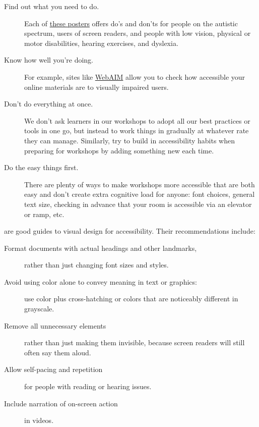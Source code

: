 \begin{description}

\item[Find out what you need to do.] Each of
  \href{https://accessibility.blog.gov.uk/2016/09/02/dos-and-donts-on-designing-for-accessibility/}{these
    posters} offers do's and don'ts for people on the autistic
  spectrum, users of screen readers, and people with low vision,
  physical or motor disabilities, hearing exercises, and dyslexia.

\item[Know how well you're doing.] For example, sites like
  \href{http://webaim.org/}{WebAIM} allow you to check how accessible
  your online materials are to visually impaired users.

\item[Don't do everything at once.]  We don't ask learners in our
  workshops to adopt all our best practices or tools in one go, but
  instead to work things in gradually at whatever rate they can
  manage.  Similarly, try to build in accessibility habits when
  preparing for workshops by adding something new each time.

\item[Do the easy things first.] There are plenty of ways to make
  workshops more accessible that are both easy and don't create extra
  cognitive load for anyone: font choices, general text size, checking
  in advance that your room is accessible via an elevator or ramp,
  etc.

\end{description}

\noindent
\cite{Coom2012,Burg2015} are good guides to visual design for
accessibility. Their recommendations include:

\begin{description}

\item[Format documents with actual headings and other landmarks,]
  rather than just changing font sizes and styles.

\item[Avoid using color alone to convey meaning in text or graphics:]
  use color plus cross-hatching or colors that are noticeably
  different in grayscale.

\item[Remove all unnecessary elements] rather than just making them
  invisible, because screen readers will still often say them aloud.

\item[Allow self-pacing and repetition] for people with reading or
  hearing issues.

\item[Include narration of on-screen action] in videos.

\end{description}

